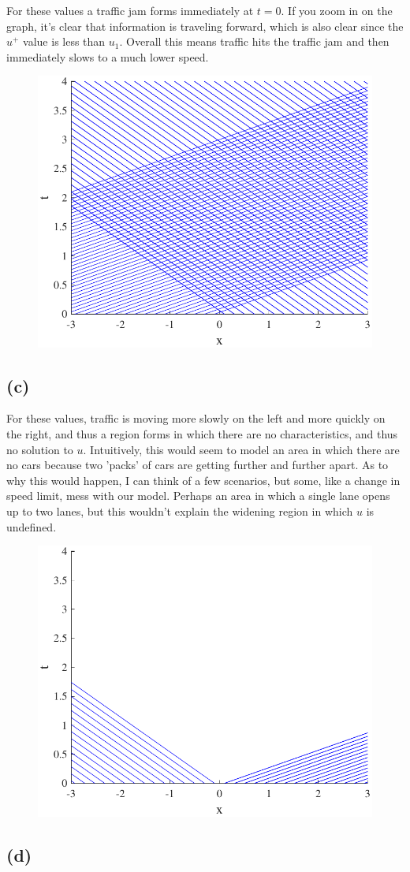 \documentclass{article}
\begin{document}
For these values a traffic jam forms immediately at $t=0$. If you zoom in on the graph, it's clear that information is traveling forward, which is also clear since the $u^+$ value is less than $u_1$. Overall this means traffic hits the traffic jam and then immediately slows to a much lower speed. 
\begin{figure}[!htbp]
  \centering
    \includegraphics[width=.49\textwidth]{hw_14_plot15.pdf}
    \caption{}
\end{figure}
\FloatBarrier

\subsection*{(c)}
For these values, traffic is moving more slowly on the left and more quickly on the right, and thus a region forms in which there are no characteristics, and thus no solution to $u$. Intuitively, this would seem to model an area in which there are no cars because two 'packs' of cars are getting further and further apart. As to why this would happen, I can think of a few scenarios, but some, like a change in speed limit, mess with our model. Perhaps an area in which a single lane opens up to two lanes, but this wouldn't explain the widening region in which $u$ is undefined.
\begin{figure}[!htbp]
  \centering
    \includegraphics[width=.49\textwidth]{hw_14_plot16.pdf}
    \caption{}
\end{figure}
\FloatBarrier
\subsection*{(d)}
\end{document}
